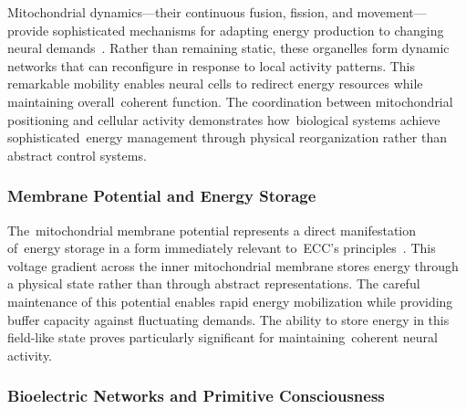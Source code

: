 Mitochondrial dynamics—their continuous fusion, fission, and movement—provide sophisticated mechanisms for adapting energy production to changing neural demands~\cite{Bertholet2016}. Rather than remaining static, these organelles form dynamic networks that can reconfigure in response to local activity patterns. This remarkable mobility enables neural cells to redirect energy resources while maintaining overall~coherent function. The coordination between mitochondrial positioning and cellular activity demonstrates how~biological systems achieve sophisticated~energy management through physical reorganization rather than abstract control systems.

\subsubsection{Membrane Potential and Energy Storage~~}

The~mitochondrial membrane potential represents a direct manifestation of~energy storage in a form immediately relevant to~ECC's principles~\cite{Nicholls2000, Picard2014}. This voltage gradient across the inner mitochondrial membrane stores energy through a physical state rather than through abstract representations. The careful maintenance of this potential enables rapid energy mobilization while providing buffer capacity against fluctuating demands. The ability to store energy in this field-like state proves particularly significant for maintaining~coherent neural activity.

\subsubsection{Bioelectric Networks and Primitive Consciousness~~}

